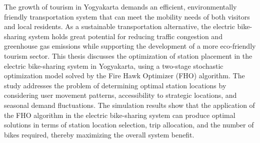 \documentclass{skripsimathugm}
\begin{document}
\begin{abstracteng}
The growth of tourism in Yogyakarta demands an efficient, environmentally friendly transportation system that can meet the mobility needs of both visitors and local residents. As a sustainable transportation alternative, the electric bike-sharing system holds great potential for reducing traffic congestion and greenhouse gas emissions while supporting the development of a more eco-friendly tourism sector. This thesis discusses the optimization of station placement in the electric bike-sharing system in Yogyakarta, using a two-stage stochastic optimization model solved by the Fire Hawk Optimizer (FHO) algorithm. The study addresses the problem of determining optimal station locations by considering user movement patterns, accessibility to strategic locations, and seasonal demand fluctuations. The simulation results show that the application of the FHO algorithm in the electric bike-sharing system can produce optimal solutions in terms of station location selection, trip allocation, and the number of bikes required, thereby maximizing the overall system benefit.
\end{abstracteng}







\end{document}
